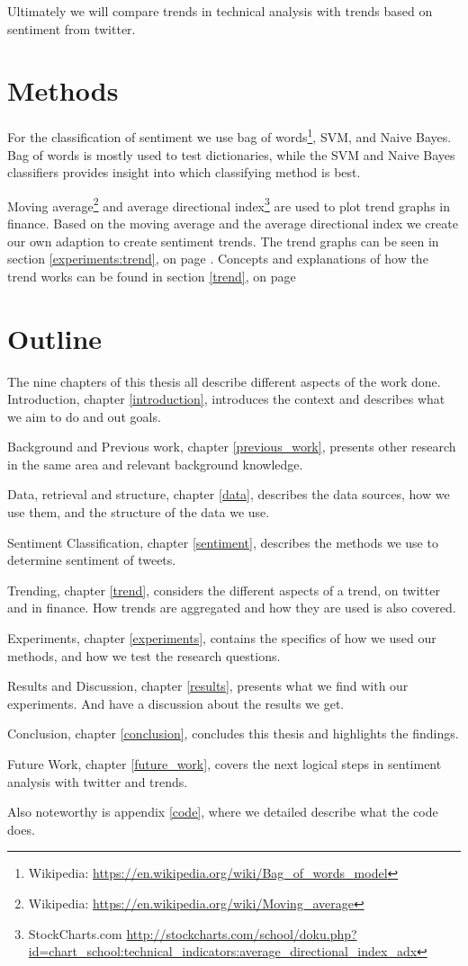 Ultimately we will compare trends in technical analysis with trends based on
sentiment from twitter. 

\section{Methods}

For the classification of sentiment we use bag of words\footnote{Wikipedia:
\url{https://en.wikipedia.org/wiki/Bag_of_words_model}}, SVM, and Naive Bayes.
Bag of words is mostly used to test dictionaries, while the SVM and Naive Bayes
classifiers provides insight into which classifying method is best. 

Moving average\footnote{Wikipedia:
\url{https://en.wikipedia.org/wiki/Moving_average}} and average directional
index\footnote{StockCharts.com
\url{http://stockcharts.com/school/doku.php?id=chart_school:technical_indicators:average_directional_index_adx}}
are used to plot trend graphs in finance.
Based on the moving average and the average directional index we create our own
adaption to create sentiment trends.  
The trend graphs can be seen in section
\ref{experiments:trend}, on page \pageref{experiments:trend}. Concepts and
explanations of how the trend works can be found in section \ref{trend}, on page \pageref{trend}

\section{Outline}
The nine chapters of this thesis all describe different aspects of the work
done. 
Introduction, chapter \ref{introduction}, introduces the context and describes
what we aim to do and out goals. 

Background and Previous work, chapter \ref{previous_work}, presents other
research in the same area and relevant background knowledge. 

Data, retrieval and structure, chapter \ref{data}, describes the data sources,
how we use them, and the structure of the data we use. 

Sentiment Classification, chapter \ref{sentiment}, describes the methods we use
to determine sentiment of tweets.  

Trending, chapter \ref{trend}, considers the different aspects of a trend, on
twitter and in finance. How trends are aggregated and how they are used is also
covered.  

Experiments, chapter \ref{experiments}, contains the specifics of how we used
our methods, and how we test the research questions.

Results and Discussion, chapter \ref{results}, presents what we find with our
experiments. And have a discussion about the results we get.   

Conclusion, chapter \ref{conclusion}, concludes this thesis and highlights the
findings.  

Future Work, chapter \ref{future_work}, covers the next logical steps in
sentiment analysis with twitter and trends.  

Also noteworthy is appendix \ref{code}, where we detailed describe what the
code does.  
%
